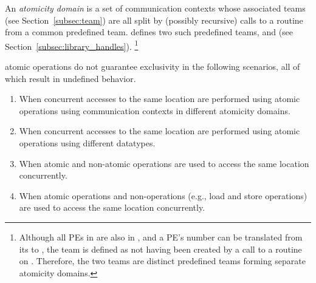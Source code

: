 An \openshmem \emph{atomicity domain} is a set of communication
contexts whose associated teams (see Section~\ref{subsec:team}) are
all split by (possibly recursive) calls to a
 routine from a common predefined team.
\openshmem defines two such predefined teams, 
and  (see Section~\ref{subsec:library_handles}).%
\footnote{
  Although all \acp{PE} in  are also
  in , and a \ac{PE}'s number can be
  translated from its  to
  , the
   team is defined as not having
  been created by a call to a  routine on
  .
  Therefore, the two teams are distinct predefined teams forming
  separate atomicity domains.
}

\openshmem atomic operations do not guarantee exclusivity in the following
scenarios, all of which result in undefined behavior.
\begin{enumerate}
    \item \label{amo-scenario/1}
        When concurrent accesses to the same location are performed using
        \openshmem atomic operations using communication contexts in
        different atomicity domains.
    \item \label{amo-scenario/2}
        When concurrent accesses to the same location are performed using
        \openshmem atomic operations using different datatypes.
    \item \label{amo-scenario/3}
        When atomic and non-atomic \openshmem operations are used to access
        the same location concurrently.
    \item \label{amo-scenario/4}
        When \openshmem atomic operations and non-\openshmem operations (e.g.,
        load and store operations) are used to access the same location
        concurrently.
\end{enumerate}



